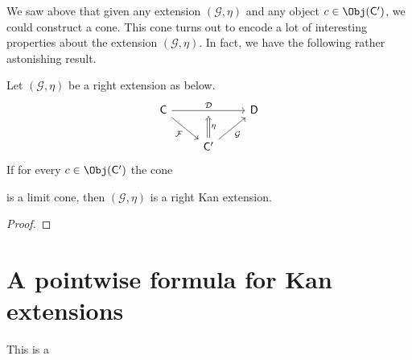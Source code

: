\documentclass[notes.tex]{subfiles}
\begin{document}
We saw above that given any extension $(\mathcal{G}, \eta)$ and any object $c \in \Obj(\mathsf{C}')$, we could construct a cone. This cone turns out to encode a lot of interesting properties about the extension $(\mathcal{G}, \eta)$. In fact, we have the following rather astonishing result.

\begin{theorem}
  Let $(\mathcal{G}, \eta)$ be a right extension as below.
  \begin{equation*}
    \begin{tikzcd}
      \mathsf{C}
      \arrow[dr, swap, "\mathcal{F}"]
      \arrow[rr, "\mathcal{D}", ""'{name=U}]
      && \mathsf{D}
      \\
      & \mathsf{C'}
      \arrow[ur, swap, "\mathcal{G}"]
      \arrow[d, to=U, Rightarrow, swap, "\eta"] 
    \end{tikzcd}
  \end{equation*}
  If for every $c \in \Obj(\mathsf{C'})$ the cone 
  
  is a limit cone, then $(\mathcal{G}, \eta)$ is a right Kan extension.
\end{theorem}
\begin{proof}

\end{proof}

\section{A pointwise formula for Kan extensions}
\label{sec:a_pointwise_formula_for_kan_extensions}

This is a 
\end{document}
